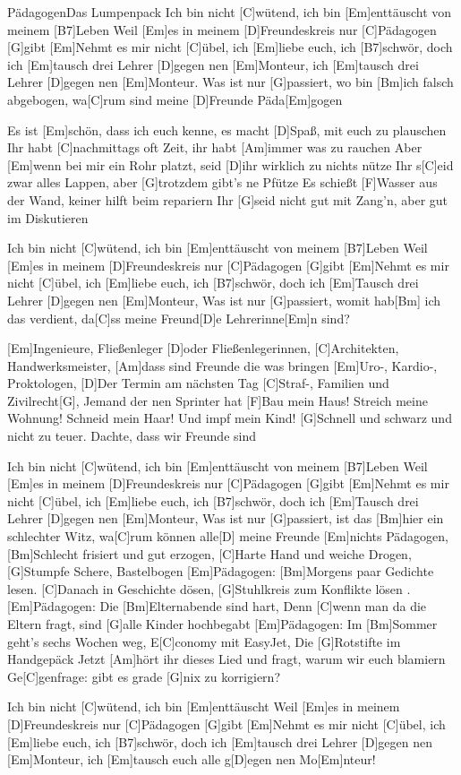 \documentclass[../main.tex]{subfiles}
\begin{document}
\begin{song}{Pädagogen}{Das Lumpenpack}{}
Ich bin nicht [C]wütend, ich bin [Em]enttäuscht von meinem [B7]Leben
Weil [Em]es in meinem [D]Freundeskreis nur [C]Pädagogen [G]gibt
[Em]Nehmt es mir nicht [C]{ü}bel, ich [Em]liebe euch, ich [B7]schwör,
doch ich [Em]tausch drei Lehrer [D]gegen nen [Em]Monteur,
ich [Em]tausch drei Lehrer [D]gegen nen [Em]Monteur.
Was ist nur [G]passiert, wo bin [Bm]ich falsch abgebogen,
wa[C]rum sind meine [D]Freunde Päda[Em]gogen

Es ist [Em]schön, dass ich euch kenne, es macht [D]Spaß, mit euch zu plauschen
Ihr habt [C]nachmittags oft Zeit, ihr habt [Am]immer was zu rauchen
Aber [Em]wenn bei mir ein Rohr platzt, seid [D]ihr wirklich zu nichts nütze
Ihr s[C]eid zwar alles Lappen, aber [G]trotzdem gibt's ne Pfütze
Es schießt [F]Wasser aus der Wand, keiner hilft beim repariern
Ihr [G]seid nicht gut mit Zang'n, aber gut im Diskutieren

Ich bin nicht [C]wütend, ich bin [Em]enttäuscht von meinem [B7]Leben
Weil [Em]es in meinem [D]Freundeskreis nur [C]Pädagogen [G]gibt
[Em]Nehmt es mir nicht [C]{ü}bel, ich [Em]liebe euch, ich [B7]schwör,
doch ich [Em]Tausch drei Lehrer [D]gegen nen [Em]Monteur,
Was ist nur [G]passiert, womit hab[Bm] ich das verdient,
da[C]ss meine Freund[D]e Lehrerinne[Em]n sind?

[Em]Ingenieure, Fließenleger [D]oder Fließenlegerinnen,
[C]Architekten, Handwerksmeister, [Am]dass sind Freunde die was bringen
[Em]Uro-, Kardio-, Proktologen, [D]Der Termin am nächsten Tag
[C]Straf-, Familien und Zivilrecht[G], Jemand der nen Sprinter hat
[F]Bau mein Haus! Streich meine Wohnung! Schneid mein Haar! Und impf mein Kind!
[G]Schnell und schwarz und nicht zu teuer. Dachte, dass wir Freunde sind

Ich bin nicht [C]wütend, ich bin [Em]enttäuscht von meinem [B7]Leben
Weil [Em]es in meinem [D]Freundeskreis nur [C]Pädagogen [G]gibt
[Em]Nehmt es mir nicht [C]{ü}bel, ich [Em]liebe euch, ich [B7]schwör,
doch ich [Em]Tausch drei Lehrer [D]gegen nen [Em]Monteur,
Was ist nur [G]passiert, ist das [Bm]hier ein schlechter Witz,
wa[C]rum können alle[D] meine Freunde [Em]nichts
\pagebreak
[G]Pädagogen, [Bm]Schlecht frisiert und gut erzogen,
[C]Harte Hand und weiche Drogen, [G]Stumpfe Schere, Bastelbogen
[Em]Pädagogen: [Bm]Morgens paar Gedichte lesen.
[C]Danach in Geschichte dösen, [G]Stuhlkreis zum Konflikte lösen .
[Em]Pädagogen: Die [Bm]Elternabende sind hart,
Denn [C]wenn man da die Eltern fragt, sind [G]alle Kinder hochbegabt
[Em]Pädagogen: Im [Bm]Sommer geht's sechs Wochen weg,
E[C]conomy mit EasyJet, Die [G]Rotstifte im Handgepäck
Jetzt [Am]hört ihr dieses Lied und fragt, warum wir euch blamiern
Ge[C]genfrage: gibt es grade [G]nix zu korrigiern?

Ich bin nicht [C]wütend, ich bin [Em]enttäuscht
Weil [Em]es in meinem [D]Freundeskreis nur [C]Pädagogen [G]gibt
[Em]Nehmt es mir nicht [C]{ü}bel, ich [Em]liebe euch, ich [B7]schwör,
doch ich [Em]tausch drei Lehrer [D]gegen nen [Em]Monteur,
ich [Em]tausch euch alle g[D]egen nen Mo[Em]nteur!
\end{song}
\end{document}
